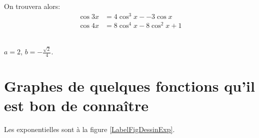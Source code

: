 \noindent On trouvera alors: \[ \begin{array} {rl}
					\cos3x&=4\cos^3x--3\cos x\\
					\cos4x&=8\cos^4x-8\cos^2x+1\end{array}\]


\\
$a=2$, $b=-\frac{\sqrt2}{4}$.


\section{Graphes de quelques fonctions qu'il est bon de connaître}


Les exponentielles sont à la figure \ref{LabelFigDessinExp}.
\newcommand{\CaptionFigDessinExp}{Des exponentielles}


%

%

%

%

%

%

%

